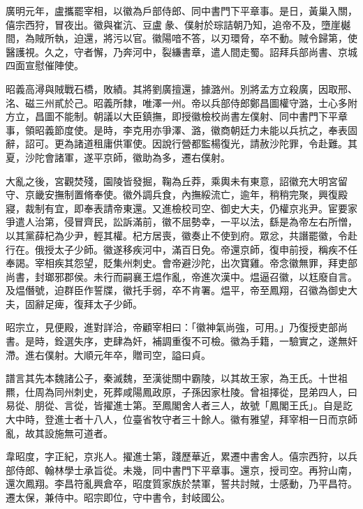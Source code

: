 \begin{pinyinscope}
 廣明元年，盧攜罷宰相，以徽為戶部侍郎、同中書門下平章事。是日，黃巢入關，僖宗西狩，冒夜出。徽與崔沆、豆盧彖、僕射於琮詰朝乃知，追帝不及，墮崖樾間，為賊所執，迫還，將污以官。徽陽喑不答，以刃環脅，卒不動。賊令歸第，使醫護視。久之，守者懈，乃奔河中，裂縑書章，遣人間走蜀。詔拜兵部尚書、京城四面宣慰催陣使。



 昭義高潯與賊戰石橋，敗績。其將劉廣擅還，據潞州。別將孟方立殺廣，因取邢、洺、磁三州貳於己。昭義所隸，唯澤一州。帝以兵部侍郎鄭昌圖權守潞，士心多附方立，昌圖不能制。朝議以大臣鎮撫，即授徽檢校尚書左僕射、同中書門下平章事，領昭義節度使。是時，李克用亦爭澤、潞，徽商朝廷力未能以兵抗之，奉表固辭，詔可。更為諸道租庸供軍使。因說行營都監楊復光，請赦沙陀罪，令赴難。其夏，沙陀會諸軍，遂平京師，徽助為多，遷右僕射。



 大亂之後，宮觀焚殘，園陵皆發掘，鞠為丘莽，乘輿未有東意，詔徽充大明宮留守、京畿安撫制置脩奉使。徽外調兵食，內撫綏流亡，逾年，稍稍完聚，興復殿寢，裁制有宜，即奉表請帝東還。又進檢校司空、御史大夫，仍權京兆尹。宦要家爭遣人治第，侵冒齊民，訟訴滿前，徽不屈勢幸，一平以法，繇是為帝左右所憎，以其黨薛杞為少尹，輕其權。杞方居喪，徽奏止不使到府。眾忿，共譖罷徽，令赴行在。俄授太子少師。徽遂移疾河中，滿百日免。帝還京師，復申前授，稱疾不任奉謁。宰相疾其怨望，貶集州刺史。會帝避沙陀，出次寶雞。帝念徽無罪，拜吏部尚書，封瑯邪郡侯。未行而嗣襄王煴作亂，帝進次漢中。煴逼召徽，以尪廢自言。及煴僭號，迫群臣作誓牒，徽托手弱，卒不肯署。煴平，帝至鳳翔，召徽為御史大夫，固辭足痺，復拜太子少師。



 昭宗立，見便殿，進對詳洽，帝顧宰相曰：「徽神氣尚強，可用。」乃復授吏部尚書。是時，銓選失序，吏肆為奸，補調重復不可檢。徽為手籍，一驗實之，遂無奸滯。進右僕射。大順元年卒，贈司空，謚曰貞。



 譜言其先本魏諸公子，秦滅魏，至漢徙關中霸陵，以其故王家，為王氏。十世祖羆，仕周為同州刺史，死葬咸陽鳳政原，子孫因家杜陵。曾祖擇從，昆弟四人，曰易從、朋從、言從，皆擢進士第。至鳳閣舍人者三人，故號「鳳閣王氏」。自是訖大中時，登進士者十八人，位臺省牧守者三十餘人。徽有雅望，拜宰相一日而京師亂，故其設施無可道者。



 韋昭度，字正紀，京兆人。擢進士第，踐歷華近，累遷中書舍人。僖宗西狩，以兵部侍郎、翰林學士承旨從。未幾，同中書門下平章事。還京，授司空。再狩山南，還次鳳翔。李昌符亂興倉卒，昭度質家族於禁軍，誓共討賊，士感動，乃平昌符。遷太保，兼侍中。昭宗即位，守中書令，封岐國公。




\end{pinyinscope}
